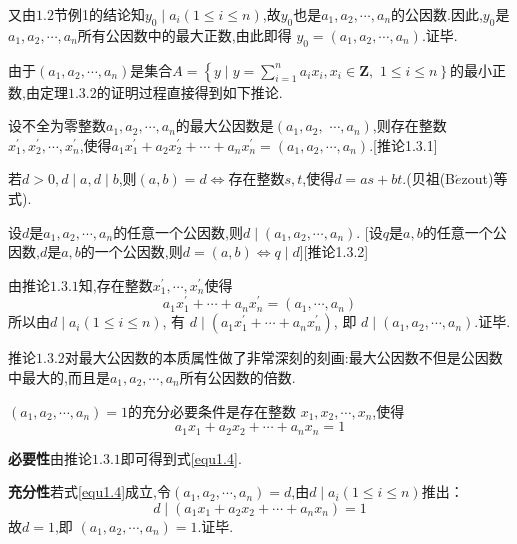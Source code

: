又由$1.2$节例1的结论知$y_{0} \mid a_{i}(1 \leqslant i \leqslant n)$,故$y_{0}$也是$a_{1}, a_{2}, \cdots, a_{n}$的公因数.因此,$y_{0}$是$a_{1}, a_{2}, \cdots, a_{n}$所有公因数中的最大正数,由此即得 $y_{0}=\left(a_{1}, a_{2}, \cdots, a_{n}\right)$.证毕.

\remark 由于$\left(a_{1}, a_{2}, \cdots, a_{n}\right)$是集合$A=\left\{y \mid y=\displaystyle{\sum_{i=1}^{n}} a_{i} x_{i}, x_{i} \in \mathbf{Z},\right.$ $\left.  1 \leqslant i \leqslant n\right\}$的最小正数,由定理$1.3 .2$的证明过程直接得到如下推论.

\corollary 设不全为零整数$a_{1}, a_{2}, \cdots, a_{n}$的最大公因数是$\left(a_{1}, a_{2}, \right.$ $\left. \cdots, a_{n}\right)$,则存在整数$x_{1}^{\prime}, x_{2}^{\prime}, \cdots, x_{n}^{\prime}$,使得$a_{1} x_{1}^{\prime}+a_{2} x_{2}^{\prime}+\cdots+a_{n} x_{n}^{\prime}=\left(a_{1}, a_{2}, \cdots, a_{n}\right)$.{\color{red}[推论1.3.1]}

\theorem 若$d>0,d\mid a,d\mid b$,则$(a,b)=d\Leftrightarrow$存在整数$s,t$,使得$d=as+bt$.(贝祖(B$\acute{e}$zout)等式).

\corollary 设$d$是$a_{1}, a_{2}, \cdots, a_{n}$的任意一个公因数,则$d \mid\left(a_{1}, a_{2}, \cdots, a_{n}\right)$. [设$q$是$a, b$的任意一个公因数,$d$是$a, b$的一个公因数,则$d=(a, b) \Leftrightarrow q \mid d$]{\color{red}[推论1.3.2]}

\proof 由推论$1.3.1$知,存在整数$x_{1}^{\prime}, \cdots, x_{n}^{\prime}$使得
\begin{equation*}
	a_{1} x_{1}^{\prime}+\cdots+a_{n} x_{n}^{\prime}=\left(a_{1}, \cdots, a_{n}\right)
\end{equation*}
所以由$d \mid a_{i}(1 \leqslant i \leqslant n)$, 有 $d \mid\left(a_{1} x_{1}^{\prime}+\cdots+a_{n} x_{n}^{\prime}\right)$, 即 $d \mid\left(a_{1}, a_{2}, \cdots, a_{n}\right)$.证毕.

\remark 推论$1.3.2$对最大公因数的本质属性做了非常深刻的刻画:最大公因数不但是公因数中最大的,而且是$a_{1}, a_{2}, \cdots, a_{n}$所有公因数的倍数.

\theorem [定理1.3.3]$\left(a_{1}, a_{2}, \cdots, a_{n}\right)=1$的充分必要条件是存在整数 $x_{1}, x_{2}, \cdots, x_{n}$,使得
\begin{equation}\label{equ1.4}
	a_{1} x_{1}+a_{2} x_{2}+\cdots+a_{n} x_{n}=1
\end{equation}

\proof \textbf{必要性}由推论$1.3.1$即可得到式\eqref{equ1.4}.

\textbf{充分性}若式\eqref{equ1.4}成立,令$\left(a_{1}, a_{2}, \cdots, a_{n}\right)=d$,由$d \mid a_{i}(1 \leqslant i \leqslant n)$推出：
\begin{equation*}
	d \mid\left(a_{1} x_{1}+a_{2} x_{2}+\cdots+a_{n} x_{n}\right)=1
\end{equation*}
故$d=1$,即 $\left(a_{1}, a_{2}, \cdots, a_{n}\right)=1$.证毕.

